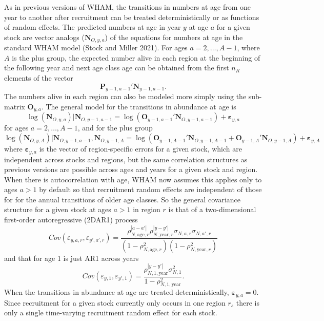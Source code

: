 \documentclass[
]{article}
\begin{document}
As in previous versions of WHAM, the transitions in numbers at age from
one year to another after recruitment can be treated deterministically
or as functions of random effects. The predicted numbers at age in year
\(y\) at age \(a\) for a given stock are vector analogs
(\(\mathbf{N}_{O,y,a}\)) of the equations for numbers at age in the
standard WHAM model (Stock and Miller 2021). For ages
\(a = 2,\ldots, A-1\), where \(A\) is the plus group, the expected
number alive in each region at the beginning of the following year and
next age class age can be obtained from the first \(n_R\) elements of
the vector \[\mathbf{P}_{y-1,a-1}' \mathbf{N}_{y-1,a-1}.\] The numbers
alive in each region can also be modeled more simply using the
sub-matrix \(\mathbf{O}_{y,a}\). The general model for the transitions
in abundance at age is \begin{equation*}
\log\left(\mathbf{N}_{O,y,a}\right)|\mathbf{N}_{O,y-1,a-1} =  \log\left(\mathbf{O}_{y-1,a-1}' \mathbf{N}_{O,y-1,a-1}\right) + \boldsymbol{\varepsilon}_{y,a}
\end{equation*} for ages \(a = 2,\ldots, A-1\), and for the plus group
\begin{equation*}
\log\left(\mathbf{N}_{O,y,A}\right)|\mathbf{N}_{O,y-1,a-1},\mathbf{N}_{O,y-1,A} = \log\left(\mathbf{O}_{y-1,A-1}' \mathbf{N}_{O,y-1,A-1} + \mathbf{O}_{y-1,A}' \mathbf{N}_{O,y-1,A}\right) + \boldsymbol{\varepsilon}_{y,A}
\end{equation*} where \(\boldsymbol{\varepsilon}_{y,a}\) is the vector
of region-specific errors for a given stock, which are independent
across stocks and regions, but the same correlation structures as
previous versions are possible across ages and years for a given stock
and region. When there is autocorrelation with age, WHAM now assumes
this applies only to ages \(a>1\) by default so that recruitment random
effects are independent of those for for the annual transitions of older
age classes. So the general covariance structure for a given stock at
ages \(a>1\) in region \(r\) is that of a two-dimensional first-order
autoregressive (2DAR1) process \begin{equation*}
  Cov\left(\varepsilon_{y,a,r},\varepsilon_{y',a',r}\right) =   \frac{\rho_{N,\text{age},r}^{|a-a'|}\rho_{N,\text{year},r}^{|y-y'|}\sigma_{N,a,r}\sigma_{N,a',r}}{\left(1 -  \rho_{N,\text{age},r}^2\right)\left(1 - \rho_{N,\text{year},r}^2\right)} 
\end{equation*} and that for age 1 is just AR1 across years
\begin{equation*}
  Cov\left(\varepsilon_{y,1},\varepsilon_{y',1}\right) =   \frac{\rho_{N,1,\text{year}}^{|y-y'|}\sigma^2_{N,1}}{1 - \rho_{N,1,\text{year}}^2}.
\end{equation*} When the transitions in abundance at age are treated
deterministically, \(\boldsymbol{\varepsilon}_{y,a} = 0\). Since
recruitment for a given stock currently only occurs in one region
\(r_s\) there is only a single time-varying recruitment random effect
for each stock.
\end{document}
